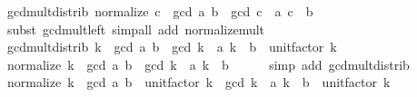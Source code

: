 \begin{isabellebody}
\endisatagproof
{\isafoldproof}%
%
\isadelimproof
\isanewline
%
\endisadelimproof
\isanewline
{}\isamarkupfalse%
\ gcd{\isacharunderscore}{\kern0pt}mult{\isacharunderscore}{\kern0pt}distrib{\isacharprime}{\kern0pt}{\isacharcolon}{\kern0pt}\ {\isachardoublequoteopen}normalize\ c\ {\isacharasterisk}{\kern0pt}\ gcd\ a\ b\ {\isacharequal}{\kern0pt}\ gcd\ {\isacharparenleft}{\kern0pt}c\ {\isacharasterisk}{\kern0pt}\ a{\isacharparenright}{\kern0pt}\ {\isacharparenleft}{\kern0pt}c\ {\isacharasterisk}{\kern0pt}\ b{\isacharparenright}{\kern0pt}{\isachardoublequoteclose}\isanewline
%
\isadelimproof
\ \ %
\endisadelimproof
%
\isatagproof
{}\isamarkupfalse%
\ {\isacharparenleft}{\kern0pt}subst\ gcd{\isacharunderscore}{\kern0pt}mult{\isacharunderscore}{\kern0pt}left{\isacharparenright}{\kern0pt}\ {\isacharparenleft}{\kern0pt}simp{\isacharunderscore}{\kern0pt}all\ add{\isacharcolon}{\kern0pt}\ normalize{\isacharunderscore}{\kern0pt}mult{\isacharparenright}{\kern0pt}%
\endisatagproof
{\isafoldproof}%
%
\isadelimproof
\isanewline
%
\endisadelimproof
\isanewline
{}\isamarkupfalse%
\ gcd{\isacharunderscore}{\kern0pt}mult{\isacharunderscore}{\kern0pt}distrib{\isacharcolon}{\kern0pt}\ {\isachardoublequoteopen}k\ {\isacharasterisk}{\kern0pt}\ gcd\ a\ b\ {\isacharequal}{\kern0pt}\ gcd\ {\isacharparenleft}{\kern0pt}k\ {\isacharasterisk}{\kern0pt}\ a{\isacharparenright}{\kern0pt}\ {\isacharparenleft}{\kern0pt}k\ {\isacharasterisk}{\kern0pt}\ b{\isacharparenright}{\kern0pt}\ {\isacharasterisk}{\kern0pt}\ unit{\isacharunderscore}{\kern0pt}factor\ k{\isachardoublequoteclose}\isanewline
%
\isadelimproof
%
\endisadelimproof
%
\isatagproof
{}\isamarkupfalse%
{\isacharminus}{\kern0pt}\isanewline
\ \ \isamarkupfalse%
\ {\isachardoublequoteopen}normalize\ k\ {\isacharasterisk}{\kern0pt}\ gcd\ a\ b\ {\isacharequal}{\kern0pt}\ gcd\ {\isacharparenleft}{\kern0pt}k\ {\isacharasterisk}{\kern0pt}\ a{\isacharparenright}{\kern0pt}\ {\isacharparenleft}{\kern0pt}k\ {\isacharasterisk}{\kern0pt}\ b{\isacharparenright}{\kern0pt}{\isachardoublequoteclose}\isanewline
\ \ \ \ \isamarkupfalse%
\ {\isacharparenleft}{\kern0pt}simp\ add{\isacharcolon}{\kern0pt}\ gcd{\isacharunderscore}{\kern0pt}mult{\isacharunderscore}{\kern0pt}distrib{\isacharprime}{\kern0pt}{\isacharparenright}{\kern0pt}\isanewline
\ \ \isamarkupfalse%
\ \isamarkupfalse%
\ {\isachardoublequoteopen}normalize\ k\ {\isacharasterisk}{\kern0pt}\ gcd\ a\ b\ {\isacharasterisk}{\kern0pt}\ unit{\isacharunderscore}{\kern0pt}factor\ k\ {\isacharequal}{\kern0pt}\ gcd\ {\isacharparenleft}{\kern0pt}k\ {\isacharasterisk}{\kern0pt}\ a{\isacharparenright}{\kern0pt}\ {\isacharparenleft}{\kern0pt}k\ {\isacharasterisk}{\kern0pt}\ b{\isacharparenright}{\kern0pt}\ {\isacharasterisk}{\kern0pt}\ unit{\isacharunderscore}{\kern0pt}factor\ k{\isachardoublequoteclose}\isanewline

\end{isabellebody}
